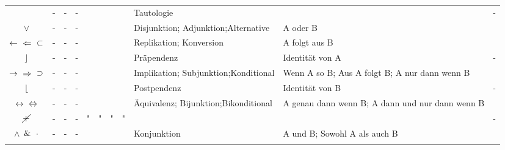 \documentclass[english,ngerman,parskip=half,headsepline,footsepline]{scrreprt}
\newcommand*{\clq}{'}%
\newcommand*{\crq}{'}%
\newcommand*{\cse}{, }%
\newcommand*{\csp}{\crqt\cset\clqt}%
\newcommand*{\clqt}{}%
\newcommand*{\crqt}{}%
\newcommand*{\cset}{~}%
\newcommand*{\cspt}{\crqt\cset\clqt}%
\begin{document}
\begin{table}
\begin{threeparttable}
\begin{tabularx}{\linewidth-10.95pt}{c||c:cc:cccc|X:X|c|}
				~ &-&-&-&\texttrue&\texttrue&\texttrue&\texttrue& Tautologie&&-\\
				\tableline%
				\clqt$\lor$\crqt &-&-&-&\texttrue&\texttrue&\texttrue&\textfalse& Disjunktion; Adjunktion;\newline Alternative&A oder B&\thepor\\
				\tableline%
				\clqt$\leftarrow$\cspt$\Leftarrow$\cspt$\subset$\crqt &-&-&-&\texttrue&\texttrue&\textfalse&\texttrue& Replikation; Konversion&A folgt aus B&\thepleftimp\\
				\tableline%
				\clqt$\operatorname{\rfloor}$\crqt &-&-&-&\texttrue&\texttrue&\textfalse&\textfalse& Präpendenz&Identität von A&-\\
				\tablegroup%

				\clqt$\rightarrow$\cspt$\Rightarrow$\cspt$\supset$\crqt &-&-&-&\texttrue&\textfalse&\texttrue&\texttrue& Implikation; Subjunktion;\newline Konditional&Wenn A so B; Aus A folgt B; A nur dann wenn B&\theprightimp\\
				\tableline%
				\clqt$\operatorname{\lfloor}$\crqt &-&-&-&\texttrue&\textfalse&\texttrue&\textfalse& Postpendenz&Identität von B&-\\
				\tableline%
				\clqt$\leftrightarrow$\cspt$\Leftrightarrow$\crqt &-&-&-&\texttrue&\textfalse&\textfalse&\texttrue& Äquivalenz; Bijunktion;\newline Bikonditional&A genau dann wenn B; A dann und nur dann wenn B&\thepequiv\\
				\gapline%
				\clqt$\operatorname{\cancel{+}}$\crqt &-&-&-&"&"&"&"& ~&&-\\
				\tableline%
				\clqt$\land$\cspt$\&$\cspt$\cdot$\crqt &-&-&-&\texttrue&\textfalse&\textfalse&\textfalse& Konjunktion&{\small A und B; Sowohl A als auch B}&\thepand\\
				\tablegroup%


\end{tabularx}
\end{threeparttable}
\end{table}
\end{document}
